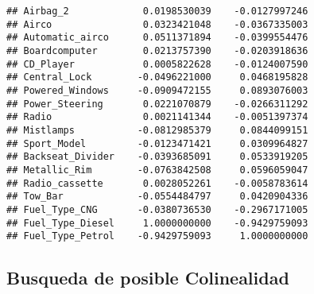\documentclass[]{article}
\newenvironment{Shaded}{\begin{snugshade}}{\end{snugshade}}
\newcommand{\KeywordTok}[1]{\textcolor[rgb]{0.13,0.29,0.53}{\textbf{#1}}}
\newcommand{\NormalTok}[1]{#1}
\newcommand{\OperatorTok}[1]{\textcolor[rgb]{0.81,0.36,0.00}{\textbf{#1}}}
\newcommand{\StringTok}[1]{\textcolor[rgb]{0.31,0.60,0.02}{#1}}
\begin{document}
\begin{verbatim}
## Airbag_2             0.0198530039    -0.0127997246
## Airco                0.0323421048    -0.0367335003
## Automatic_airco      0.0511371894    -0.0399554476
## Boardcomputer        0.0213757390    -0.0203918636
## CD_Player            0.0005822628    -0.0124007590
## Central_Lock        -0.0496221000     0.0468195828
## Powered_Windows     -0.0909472155     0.0893076003
## Power_Steering       0.0221070879    -0.0266311292
## Radio                0.0021141344    -0.0051397374
## Mistlamps           -0.0812985379     0.0844099151
## Sport_Model         -0.0123471421     0.0309964827
## Backseat_Divider    -0.0393685091     0.0533919205
## Metallic_Rim        -0.0763842508     0.0596059047
## Radio_cassette       0.0028052261    -0.0058783614
## Tow_Bar             -0.0554484797     0.0420904336
## Fuel_Type_CNG       -0.0380736530    -0.2967171005
## Fuel_Type_Diesel     1.0000000000    -0.9429759093
## Fuel_Type_Petrol    -0.9429759093     1.0000000000
\end{verbatim}

\hypertarget{busqueda-de-posible-colinealidad}{%
\subsection{Busqueda de posible
Colinealidad}\label{busqueda-de-posible-colinealidad}}

\begin{Shaded}
\end{Shaded}
\end{document}

